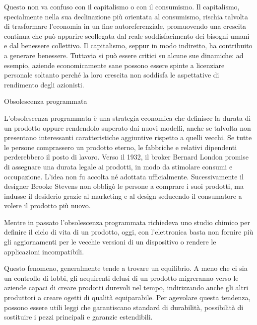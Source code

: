 \documentclass[12pt]{book} %
\begin{document}
Questo non va confuso con il capitalismo o con il consumismo. Il capitalismo, specialmente nella sua declinazione più orientata al consumismo, rischia talvolta di trasformare l'economia in un fine autoreferenziale, promuovendo una crescita continua che può apparire scollegata dal reale soddisfacimento dei bisogni umani e dal benessere collettivo.
Il capitalismo, seppur in modo indiretto, ha contribuito a generare benessere. Tuttavia si può essere critici su alcune sue dinamiche: ad esempio, aziende economicamente sane possono essere spinte a licenziare personale soltanto perché la loro crescita non soddisfa le aspettative di rendimento degli azionisti. 

\begin{mdframed}[linewidth=1pt]
Obsolescenza programmata

L'obsolescenza programmata è una strategia economica che definisce la durata di un prodotto oppure rendendolo superato dai nuovi modelli, anche se talvolta non presentano interessanti caratteristiche aggiuntive rispetto a quelli vecchi.
Se tutte le persone comprassero un prodotto eterno, le fabbriche e relativi dipendenti perderebbero il posto di lavoro. 
Verso il 1932, il broker Bernard London promise di assegnare una durata legale ai prodotti, in modo da stimolare consumi e occupazione. L’idea non fu accolta né adottata ufficialmente. Sucessivamente il designer Brooke Stevens non obbligò le persone a comprare i suoi prodotti, ma indusse il desiderio grazie al marketing e al design seducendo il consumatore a volere il prodotto più nuovo.

Mentre in passato l'obsolescenza programmata richiedeva uno studio chimico per definire il ciclo di vita di un prodotto, oggi, con l'elettronica basta non fornire più gli aggiornamenti per le vecchie versioni di un dispositivo o rendere le applicazioni
incompatibili. 

Questo fenomeno, generalmente tende a trovare un equilibrio. A meno che ci sia un controllo di lobbi, gli acquirenti delusi di un prodotto migreranno verso le
aziende capaci di creare prodotti durevoli nel tempo, indirizzando anche
gli altri produttori a creare ogetti di qualità equiparabile. Per agevolare questa tendenza, possono essere utili leggi che garantiscano standard di durabilità, possibilità di sostituire i pezzi principali e garanzie estendibili.
\end{mdframed}
\end{document}
